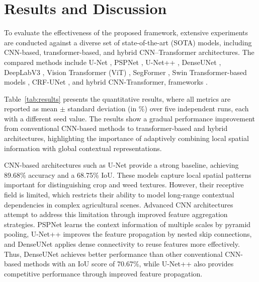 \documentclass[pdflatex,sn-mathphys-num]{sn-jnl}
\begin{document}
\section{Results and Discussion}
To evaluate the effectiveness of the proposed framework, extensive experiments are conducted against a diverse set of state-of-the-art (SOTA) models, including CNN-based, transformer-based, and hybrid CNN--Transformer architectures. The compared methods include U-Net \cite{ronneberger2015unet}, PSPNet \cite{zhao2017pyramid}, U-Net++ \cite{zhou2018unet++}, DenseUNet \cite{mu2023densenet}, DeepLabV3 \cite{chen2018Deeplabv3plus}, Vision Transformer (ViT) \cite{dosovitskiy2021vit}, SegFormer \cite{xie2021segformer}, Swin Transformer-based models \cite{liu2021swin}, CRF-UNet \cite{sahin2023segmentation}, and hybrid CNN-Transformer, frameworks \cite{guo2025cnn_transformer}.

Table~\ref{tab:results} presents the quantitative results, where all metrics are reported as mean $\pm$ standard deviation (in \%) over five independent runs, each with a different seed value. The results show a gradual performance improvement from conventional CNN-based methods to transformer-based and hybrid architectures, highlighting the importance of adaptively combining local spatial information with global contextual representations.

CNN-based architectures such as U-Net provide a strong baseline, achieving 89.68\% accuracy and a 68.75\% IoU. These models capture local spatial patterns important for distinguishing crop and weed textures. However, their receptive field is limited, which restricts their ability to model long-range contextual dependencies in complex agricultural scenes. Advanced CNN architectures attempt to address this limitation through improved feature aggregation strategies. PSPNet learns the context information of multiple scales by pyramid pooling, U-Net++ improves the feature propagation by nested skip connections, and DenseUNet applies dense connectivity to reuse features more effectively. Thus, DenseUNet achieves better performance than other conventional CNN-based methods with an IoU score of 70.67\%, while U-Net++ also provides competitive performance through improved feature propagation.
\end{document}

